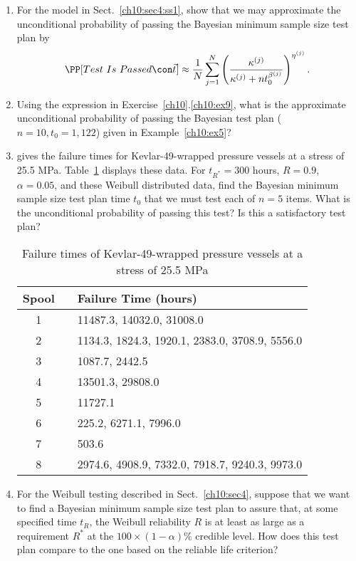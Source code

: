 \documentclass {book}
\begin{document}
\begin{enumerate}[\ref{ch10}.1]
\item \label{ch10:ex9} For the model in Sect.~\ref{ch10:sec4:ss1},
show that we may approximate the unconditional probability of
passing the Bayesian minimum sample size test plan by
\begin{displaymath}
 \PP[Test\mbox{ }Is\mbox{ }Passed \con \vec{t} ] \approx \frac
 {1}{N}\sum^{N}_{j=1}\left(\frac
 {\kappa^{(j)}}{\kappa^{(j)}+nt^{\beta^{(j)}}_{0}}\right)^{\eta^{(j)}}.
\end{displaymath}

\item Using the expression in Exercise~\ref{ch10}.\ref{ch10:ex9},
what is the approximate unconditional probability of passing the
Bayesian test plan ($n = 10, t_{0} = 1,122$) given in
Example~\ref{ch10:ex5}?

\item \citet{GK83}  gives the failure times for Kevlar-49-wrapped
pressure vessels at a stress of 25.5 MPa. Table~\ref{ch10:tab10}
displays these data. For $t_{R^*} = 300$ hours, $R = 0.9$, $\alpha
= 0.05$, and these Weibull distributed data, find the Bayesian
minimum sample size test plan time $t_{0}$ that we must test each
of $n = 5$ items. What is the unconditional probability of passing
this test? Is this a satisfactory test plan?  


\begin{table}
\caption{Failure times of Kevlar-49-wrapped pressure vessels at a
stress of 25.5 MPa \citep{GK83}}\label{ch10:tab10}
 \centering
\begin{tabular}{cll}
\hline Spool & \mbox{} & \hspace{0.5in}Failure Time (hours) \\
\hline%
1 & \mbox{} & 11487.3, 14032.0, 31008.0\\
2 & \mbox{} & 1134.3, 1824.3, 1920.1, 2383.0,
 3708.9, 5556.0\\
3 & \mbox{} & 1087.7, 2442.5\\
4 & \mbox{} & 13501.3, 29808.0\\
5 & \mbox{} & 11727.1\\
6 & \mbox{} & 225.2, 6271.1, 7996.0\\
7 & \mbox{} & 503.6\\
8 & \mbox{} & 2974.6, 4908.9, 7332.0, 7918.7,
 9240.3, 9973.0\\
\hline
\end{tabular}
\end{table}

\item For the Weibull testing described in
Sect.~\ref{ch10:sec4}, suppose that we want to find a Bayesian
minimum sample size test plan to assure that, at some
specified time $t_{R}$, the Weibull reliability $R$ is at least as
large as a requirement $R^*$ at the $100\times (1 - \alpha)$\%
credible level. How does this test plan compare to the one based on
the reliable life criterion?
\end{enumerate}
\end{document}
